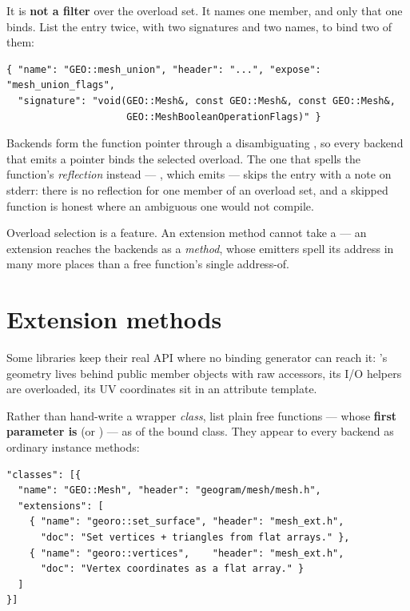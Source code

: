 It is \textbf{not a filter} over the overload set. It names one member, and only
that one binds. List the entry twice, with two signatures and two 
names, to bind two of them:

\begin{lstlisting}[style=json]
{ "name": "GEO::mesh_union", "header": "...", "expose": "mesh_union_flags",
  "signature": "void(GEO::Mesh&, const GEO::Mesh&, const GEO::Mesh&,
                     GEO::MeshBooleanOperationFlags)" }
\end{lstlisting}

Backends form the function pointer through a disambiguating
, so every backend that emits a pointer binds the selected
overload. The one that spells the function's \emph{reflection} instead ---
, which emits  --- skips the entry
with a note on stderr: there is no reflection for one member of an overload set,
and a skipped function is honest where an ambiguous one would not compile.

\begin{note}
Overload selection is a  feature. An extension method cannot
take a  --- an extension reaches the backends as a
\emph{method}, whose emitters spell its address in many more places than a free
function's single address-of.
\end{note}

\section{Extension methods}
\label{sec:extensions}

Some libraries keep their real API where no binding generator can reach it:
's geometry lives behind public member objects with raw
 accessors, its I/O helpers are overloaded, its UV coordinates sit
in an attribute template.

Rather than hand-write a wrapper \emph{class}, list plain free functions ---
whose \textbf{first parameter is } (or ) --- as
 of the bound class. They appear to every backend as ordinary
instance methods:

\begin{lstlisting}[style=json]
"classes": [{
  "name": "GEO::Mesh", "header": "geogram/mesh/mesh.h",
  "extensions": [
    { "name": "georo::set_surface", "header": "mesh_ext.h",
      "doc": "Set vertices + triangles from flat arrays." },
    { "name": "georo::vertices",    "header": "mesh_ext.h",
      "doc": "Vertex coordinates as a flat array." }
  ]
}]
\end{lstlisting}

